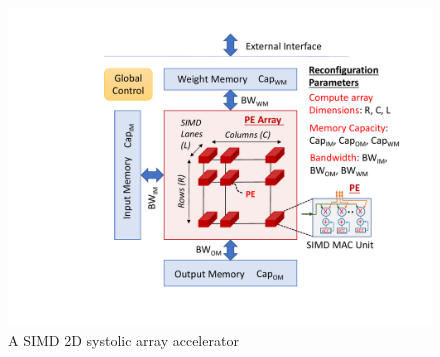 


\begin{figure}
    \centering
    \includegraphics[width=0.5\linewidth]{figs/syst-array.pdf}
    \caption{A SIMD 2D systolic array accelerator}
    \label{fig:systolic_array}
\end{figure}

